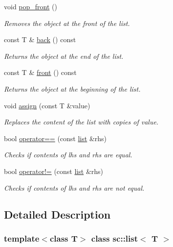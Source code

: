 \begin{DoxyCompactItemize}
void \mbox{\hyperlink{classsc_1_1list_ab3fbf66643f4356cf0c1947bd4fdf48e}{pop\+\_\+front}} ()
\begin{DoxyCompactList}\small\item\em Removes the object at the front of the list. \end{DoxyCompactList}\item 
const T \& \mbox{\hyperlink{classsc_1_1list_a03ed3eccb9d7cff1d695c13d496dd26c}{back}} () const
\begin{DoxyCompactList}\small\item\em Returns the object at the end of the list. \end{DoxyCompactList}\item 
const T \& \mbox{\hyperlink{classsc_1_1list_ae77ff1c80fd6f0e07d397c6305be68be}{front}} () const
\begin{DoxyCompactList}\small\item\em Returns the object at the beginning of the list. \end{DoxyCompactList}\item 
void \mbox{\hyperlink{classsc_1_1list_a78a44a732aedc5c4aa42f5437dec0100}{assign}} (const T \&value)
\begin{DoxyCompactList}\small\item\em Replaces the content of the list with copies of {\ttfamily value}. \end{DoxyCompactList}\item 
bool \mbox{\hyperlink{classsc_1_1list_aaf499f0f0f272bfdc2700fa09570e369}{operator==}} (const \mbox{\hyperlink{classsc_1_1list}{list}} \&rhs)
\begin{DoxyCompactList}\small\item\em Checks if contents of lhs and rhs are equal. \end{DoxyCompactList}\item 
bool \mbox{\hyperlink{classsc_1_1list_a3816dba10dfc783cffc373bd601a8b18}{operator!=}} (const \mbox{\hyperlink{classsc_1_1list}{list}} \&rhs)
\begin{DoxyCompactList}\small\item\em Checks if contents of lhs and rhs are not equal. \end{DoxyCompactList}\end{DoxyCompactItemize}


\subsection{Detailed Description}
\subsubsection*{template$<$class T$>$\newline
class sc\+::list$<$ T $>$}

